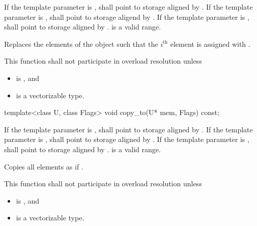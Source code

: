 \begin{itemdescr}
  \pnum\requires
  If the template parameter  is ,  shall point to storage aligned by . If the template parameter  is ,  shall point to storage aligend by . If the template parameter  is ,  shall point to storage aligned by . \tcode{[mem, mem + size())} is a valid range.

  \pnum\effects
  Replaces the elements of the  object such that the $i^\text{th}$ element is assigned with  \foralli.

  \pnum\remarks
  This function shall not participate in overload resolution unless
  \begin{itemize}
    \item {} is , and
    \item {} is a vectorizable type.
  \end{itemize}
\end{itemdescr}

\begin{itemdecl}
template<class U, class Flags> void copy_to(U* mem, Flags) const;
\end{itemdecl}

\begin{itemdescr}
  \pnum\requires
  If the template parameter  is ,  shall point to storage aligned by . If the template parameter  is ,  shall point to storage aligned by . If the template parameter  is ,  shall point to storage aligned by . \tcode{[mem, mem + size())} is a valid range.

  \pnum\effects
  Copies all  elements as if  \foralli.

  \pnum\remarks
  This function shall not participate in overload resolution unless
  \begin{itemize}
    \item {} is , and
    \item {} is a vectorizable type.
  \end{itemize}
\end{itemdescr}

